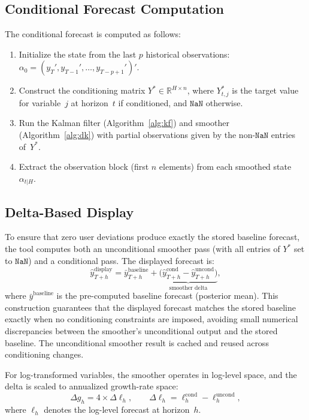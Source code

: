 \documentclass[11pt]{article}
\newcommand{\R}{\mathbb{R}}
\theoremstyle{definition}
\theoremstyle{remark}
\begin{document}
\subsection{Conditional Forecast Computation}

The conditional forecast is computed as follows:
\begin{enumerate}
  \item Initialize the state from the last $p$ historical
    observations: $\alpha_0 = (y_T', y_{T-1}', \ldots, y_{T-p+1}')'$.
  \item Construct the conditioning matrix $Y^* \in \R^{H \times n}$,
    where $Y^*_{t,j}$ is the target value for variable~$j$ at
    horizon~$t$ if conditioned, and $\texttt{NaN}$ otherwise.
  \item Run the Kalman filter (Algorithm~\ref{alg:kf}) and smoother
    (Algorithm~\ref{alg:dk}) with partial observations given
    by the non-$\texttt{NaN}$ entries of~$Y^*$.
  \item Extract the observation block (first $n$ elements) from each
    smoothed state $\alpha_{t|H}$.
\end{enumerate}

\subsection{Delta-Based Display}\label{sec:delta}

To ensure that zero user deviations produce exactly the stored
baseline forecast, the tool computes both an unconditional smoother
pass (with all entries of $Y^*$ set to $\texttt{NaN}$) and a
conditional pass.  The displayed forecast is:
\begin{equation}\label{eq:delta}
  \hat{y}_{T+h}^{\text{display}} = \bar{y}_{T+h}^{\text{baseline}}
  + \underbrace{\bigl(\hat{y}_{T+h}^{\text{cond}} -
  \hat{y}_{T+h}^{\text{uncond}}\bigr)}_{\text{smoother delta}},
\end{equation}
where $\bar{y}^{\text{baseline}}$ is the pre-computed baseline
forecast (posterior mean).  This construction guarantees that the
displayed forecast matches the stored baseline exactly when no
conditioning constraints are imposed, avoiding small numerical
discrepancies between the smoother's unconditional output and the
stored baseline.  The unconditional smoother result is cached and
reused across conditioning changes.

For log-transformed variables, the smoother operates in log-level
space, and the delta is scaled to annualized growth-rate space:
\begin{equation}\label{eq:scale}
  \Delta g_h = 4 \times \Delta \ell_h, \qquad
  \Delta \ell_h = \ell_h^{\text{cond}} - \ell_h^{\text{uncond}},
\end{equation}
where $\ell_h$ denotes the log-level forecast at horizon~$h$.
\end{document}
